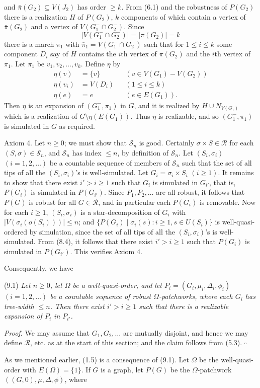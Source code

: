 \noindent and $\bar{\pi}(G_2) \subseteq V(J_2)$ has order $\ge k$. From (6.1) and the robustness of $P(G_2)$ there is a realization $H$ of $P(G_2)$, $k$ components of which contain a vertex of $\bar{\pi}(G_2)$ and a vertex of $V(G_1^- \cap G_2^-)$. Since
\begin{equation*}
|V(G_1^- \cap G_2^-)| = |\pi(G_2)| = k
\end{equation*}
there is a march $\pi_1$ with $\bar{\pi}_1 = V(G_1^- \cap G_2^-)$ such that for $1 \le i \le k$ some component $D_i$ say of $H$ contains the $i$th vertex of $\pi(G_2)$ and the $i$th vertex of $\pi_1$. Let $\pi_1$ be $v_1, v_2, \dots, v_k$. Define $\eta$ by
\begin{align*}
\eta(v) &= \{v\} && (v \in V(G_1) - V(G_2)) \\
\eta(v_i) &= V(D_i) && (1 \le i \le k) \\
\eta(e) &= e && (e \in E(G_1)).
\end{align*}
Then $\eta$ is an expansion of $(G_1^-, \pi_1)$ in $G$, and it is realized by $H \cup N_{V(G_1)}$ which is a realization of $G \setminus \eta(E(G_1))$. Thus $\eta$ is realizable, and so $(G_1^-, \pi_1)$ is simulated in $G$ as required.

Axiom 4. Let $n \ge 0$; we must show that $\mathscr{S}_n$ is good. Certainly $\sigma \times S \in \mathscr{R}$ for each $(S, \sigma) \in \mathscr{S}_n$, and $\mathscr{S}_n$ has index $\le n$, by definition of $\mathscr{S}_n$. Let $(S_i, \sigma_i)$ $(i = 1, 2, \dots)$ be a countable sequence of members of $\mathscr{S}_n$ such that the set of all tips of all the $(S_i, \sigma_i)$'s is well-simulated. Let $G_i = \sigma_i \times S_i$ $(i \ge 1)$. It remains to show that there exist $i' > i \ge 1$ such that $G_i$ is simulated in $G_{i'}$, that is, $P(G_i)$ is simulated in $P(G_{i'})$. Since $P_1, P_2, \dots$ are all robust, it follows that $P(G)$ is robust for all $G \in \mathscr{R}$, and in particular each $P(G_i)$ is removable. Now for each $i \ge 1$, $(S_i, \sigma_i)$ is a star-decomposition of $G_i$ with $|V(\sigma_i(o(S_i)))| \le n$; and $\{P(G_i) \mid \sigma_i(s) \colon i \ge 1, s \in U(S_i)\}$ is well-quasi-ordered by simulation, since the set of all tips of all the $(S_i, \sigma_i)$'s is well-simulated. From (8.4), it follows that there exist $i' > i \ge 1$ such that $P(G_i)$ is simulated in $P(G_{i'})$. This verifies Axiom 4.

Consequently, we have

\stmt
(9.1) \textit{Let $n \ge 0$, let $\Omega$ be a well-quasi-order, and let $P_i = (G_i, \mu_i, \Delta_i, \phi_i)$ $(i = 1, 2, \dots)$ be a countable sequence of robust $\Omega$-patchworks, where each $G_i$ has tree-width $\le n$. Then there exist $i' > i \ge 1$ such that there is a realizable expansion of $P_i$ in $P_{i'}$.}

\textit{Proof.} We may assume that $G_1, G_2, \dots$ are mutually disjoint, and hence we may define $\mathscr{R}$, etc. as at the start of this section; and the claim follows from (5.3). $\square$

As we mentioned earlier, (1.5) is a consequence of (9.1). Let $\Omega$ be the well-quasi-order with $E(\Omega) = \{1\}$. If $G$ is a graph, let $P(G)$ be the $\Omega$-patchwork $((G, 0), \mu, \Delta, \phi)$, where
